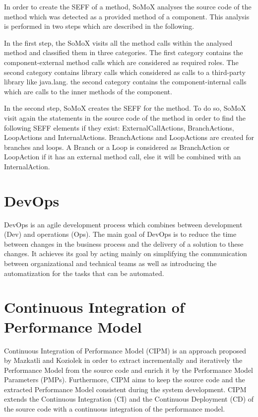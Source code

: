 In order to create the SEFF of a method, SoMoX analyses the source code of the method which was detected as a provided method of a component. This analysis is performed in two steps which are described in the following.

In the first step, the SoMoX visits all the method calls within the analysed method and classified them in three categories. The first category contains the component-external method calls which are considered as required roles. The second category contains library calls which considered as calls to a third-party library like java.lang. the second category contains the component-internal calls which are calls to the inner methods of the component. 

In the second step, SoMoX creates the SEFF for the method.  To do so, SoMoX visit again the statements in the source code of the method in order to find the following SEFF elements if they exist: ExternalCallActions, BranchActions, LoopActions and InternalActions. BranchActions and LoopActions are created for branches and loops. A Branch or a Loop is considered as BranchAction or LoopAction if it has an external method call, else it will be combined with an InternalAction.

\section{DevOps}
\label{sec:DevOps}
DevOps \cite{brunnert2015performance} is an agile development process which combines between development (Dev) and operations (Ops). The main goal of DevOps is to reduce the time between changes in the business process and the delivery of a solution to these changes. It achieves its goal by acting mainly on simplifying the communication between organizational and technical teams as well as introducing the automatization for the tasks that can be automated. 

\section{Continuous Integration of Performance Model}
\label{sec:Continuous Integration of Performance Model}
Continuous Integration of Performance Model (CIPM) is an approach proposed by Mazkatli and Koziolek \cite{mazkatli2018continuous} in order to extract incrementally and iteratively the Performance Model from the source code and enrich it by the Performance Model Parameters (PMPs). Furthermore, CIPM aims to keep the source code and the extracted Performance Model consistent during the system development. CIPM extends the Continuous Integration (CI) and the Continuous Deployment (CD) of the source code with a continuous integration of the performance model. 

